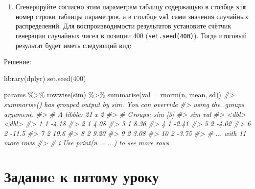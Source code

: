 \documentclass[
]{book}
\newenvironment{Shaded}{\begin{snugshade}}{\end{snugshade}}
\newcommand{\AttributeTok}[1]{\textcolor[rgb]{0.77,0.63,0.00}{#1}}
\newcommand{\CommentTok}[1]{\textcolor[rgb]{0.56,0.35,0.01}{\textit{#1}}}
\newcommand{\DecValTok}[1]{\textcolor[rgb]{0.00,0.00,0.81}{#1}}
\newcommand{\FunctionTok}[1]{\textcolor[rgb]{0.00,0.00,0.00}{#1}}
\newcommand{\NormalTok}[1]{#1}
\newcommand{\SpecialCharTok}[1]{\textcolor[rgb]{0.00,0.00,0.00}{#1}}
\providecommand{\tightlist}{%
  \setlength{\itemsep}{0pt}\setlength{\parskip}{0pt}}
\begin{document}
\begin{enumerate}
\def\labelenumi{\arabic{enumi}.}
\tightlist
\item
  Сгенерируйте согласно этим параметрам таблицу содержащую в столбце \texttt{sim} номер строки таблицы параметров, а в столбце \texttt{val} сами значения случайных распределений. Для воспроизводимости результатов установите счётчик генерации случайных чисел в позиции 400 (\texttt{set.seed(400)}). Тогда итоговый результат будет иметь следующий вид:
\end{enumerate}

Решение:

\begin{Shaded}
\begin{Highlighting}[]
\FunctionTok{library}\NormalTok{(dplyr)}
\FunctionTok{set.seed}\NormalTok{(}\DecValTok{400}\NormalTok{)}

\NormalTok{params }\SpecialCharTok{\%\textgreater{}\%}
   \FunctionTok{rowwise}\NormalTok{(sim) }\SpecialCharTok{\%\textgreater{}\%}
   \FunctionTok{summarise}\NormalTok{(}\AttributeTok{val =} \FunctionTok{rnorm}\NormalTok{(n, mean, sd))}
\CommentTok{\#\textgreater{} \textasciigrave{}summarise()\textasciigrave{} has grouped output by \textquotesingle{}sim\textquotesingle{}. You can override}
\CommentTok{\#\textgreater{} using the \textasciigrave{}.groups\textasciigrave{} argument.}
\CommentTok{\#\textgreater{} \# A tibble: 21 x 2}
\CommentTok{\#\textgreater{} \# Groups:   sim [3]}
\CommentTok{\#\textgreater{}      sim    val}
\CommentTok{\#\textgreater{}    \textless{}dbl\textgreater{}  \textless{}dbl\textgreater{}}
\CommentTok{\#\textgreater{}  1     1  {-}4.18}
\CommentTok{\#\textgreater{}  2     1   4.08}
\CommentTok{\#\textgreater{}  3     1   8.36}
\CommentTok{\#\textgreater{}  4     1  {-}2.41}
\CommentTok{\#\textgreater{}  5     2  {-}4.02}
\CommentTok{\#\textgreater{}  6     2 {-}11.5 }
\CommentTok{\#\textgreater{}  7     2  10.6 }
\CommentTok{\#\textgreater{}  8     2   9.20}
\CommentTok{\#\textgreater{}  9     2   3.08}
\CommentTok{\#\textgreater{} 10     2  {-}3.75}
\CommentTok{\#\textgreater{} \# ... with 11 more rows}
\CommentTok{\#\textgreater{} \# i Use \textasciigrave{}print(n = ...)\textasciigrave{} to see more rows}
\end{Highlighting}
\end{Shaded}

\hypertarget{ux437ux430ux434ux430ux43dux438e-ux43a-ux43fux44fux442ux43eux43cux443-ux443ux440ux43eux43aux443}{%
\section*{Заданиe к пятому уроку}\label{ux437ux430ux434ux430ux43dux438e-ux43a-ux43fux44fux442ux43eux43cux443-ux443ux440ux43eux43aux443}}
\end{document}
